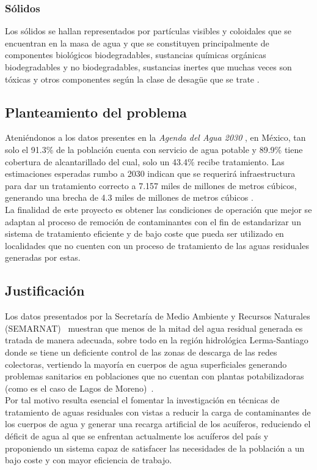 \subsubsection*{Sólidos}
Los sólidos se hallan representados por partículas  visibles y coloidales que se encuentran en la masa de agua y que se constituyen principalmente de componentes biológicos biodegradables, sustancias químicas orgánicas biodegradables y no biodegradables, sustancias inertes que muchas veces son tóxicas y otros componentes según la clase de desagüe que se trate \emph{\citep{carreno17}}.
\subsection*{Planteamiento del problema}
Ateniéndonos a los datos presentes en la \emph{Agenda del Agua 2030} \emph{\citep{aa2030}}, en México, tan solo el 91.3\% de la población cuenta con servicio de agua potable y 89.9\% tiene cobertura de alcantarillado del cual, solo un 43.4\% recibe tratamiento. Las estimaciones esperadas rumbo a 2030 indican que se requerirá infraestructura para dar un tratamiento correcto a 7.157 miles de millones de metros cúbicos, generando una brecha de 4.3 miles de millones de metros cúbicos \emph{\citep{aa2030}}.\\
La finalidad de este proyecto es obtener las condiciones de operación que mejor se adaptan al proceso de remoción de contaminantes con el fin de estandarizar un sistema de tratamiento eficiente y de bajo coste que pueda ser utilizado en localidades que no cuenten con un proceso de tratamiento de las aguas residuales generadas por estas.
\subsection*{Justificación}
Los datos presentados por la Secretaría de Medio Ambiente y Recursos Naturales (SEMARNAT)~\emph{\citep{Sis22}} muestran que menos de la mitad del agua residual generada es tratada de manera adecuada, sobre todo en la región hidrológica Lerma-Santiago donde se tiene un deficiente control de las zonas de descarga de las redes colectoras, vertiendo la mayoría en cuerpos de agua superficiales generando problemas sanitarios en poblaciones que no cuentan con plantas potabilizadoras (como es el caso de Lagos de Moreno)~\emph{\citep{aa2030}}.\\
Por tal motivo resulta esencial el fomentar la investigación en técnicas de tratamiento de aguas residuales con vistas a reducir la carga de contaminantes de los cuerpos de agua y generar una recarga artificial de los acuíferos, reduciendo el déficit de agua al que se enfrentan actualmente los acuíferos del país y proponiendo un sistema capaz de satisfacer las necesidades de la población a un bajo coste y con mayor eficiencia de trabajo.

